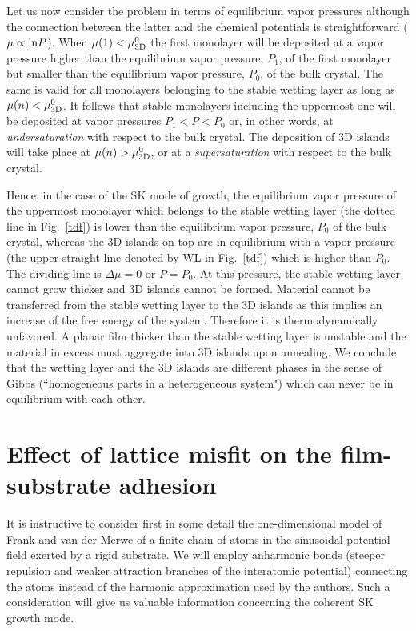 \documentclass[aps,prl,showpacs,twocolumn,byrevtex,floatfix]{revtex4-1}
\begin{document}
Let us now consider the problem in terms of equilibrium vapor pressures although
the connection between the latter and the chemical potentials is straightforward
($\mu \propto {\rm ln}P$). When $\mu (1) < \mu_{\rm 3D}^0$ the first monolayer
will be deposited at a vapor pressure higher than the equilibrium vapor
pressure, $P_1$, of the first monolayer but smaller than the equilibrium vapor
pressure, $P_0$, of the bulk crystal. The same is valid for all monolayers
belonging to the stable wetting layer as long as $\mu (n) < \mu_{\rm 3D}^0$. It
follows that stable monolayers including the uppermost one will be deposited at
vapor pressures $P_1 < P < P_0$ or, in other words, at {\it undersaturation}
with respect to the bulk crystal. The deposition of 3D islands will take place
at $\mu (n) > \mu_{\rm 3D}^0$, or at a {\it supersaturation} with respect to the
bulk crystal.

Hence, in the case of the SK mode of growth, the equilibrium vapor 
pressure of the
uppermost monolayer which belongs to the stable wetting layer (the dotted line
in Fig.\ \ref{tdf}) is lower than the equilibrium vapor pressure, $P_0$ of the
bulk crystal, whereas the 3D islands on top are in equilibrium with a vapor
pressure (the upper straight line denoted by WL in Fig.\ \ref{tdf}) which is
higher than $P_0$. The dividing line is $\Delta \mu = 0$ or $P = P_0$. At this
pressure, the stable wetting layer cannot grow thicker and 3D islands cannot be
formed. Material cannot be transferred from the stable wetting layer to the 3D 
islands as this implies an increase of the free energy of the system. Therefore
it is thermodynamically unfavored. A planar film thicker than the stable 
wetting layer is unstable and the material in excess must aggregate into
3D islands upon annealing. We conclude that the wetting layer and the 3D 
islands are different phases in the sense of Gibbs (``homogeneous parts in a
heterogeneous system")\cite{Gibbs28} which can never be in equilibrium with 
each other.

\section{Effect of lattice misfit on the film-substrate adhesion}

It is instructive to consider first in some detail the one-dimensional
model of Frank and van der Merwe of a finite chain of atoms in the sinusoidal
potential field exerted by a rigid substrate.\cite{Frank49,Frank491} We will
employ anharmonic bonds (steeper repulsion and weaker attraction branches of the
interatomic potential) connecting the atoms instead of the harmonic
approximation used by the authors.\cite{Markov84,Markov841} Such a consideration
will give us valuable information concerning the coherent SK growth mode.
\end{document}
